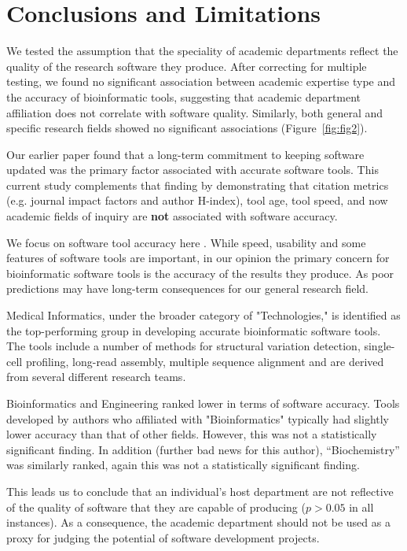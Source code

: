 \documentclass[fleqn,10pt,doc,onecolumn]{SelfArx}%
\begin{document}

\section*{Conclusions and Limitations}

We tested the assumption that the speciality of academic departments
reflect the quality of the research software they produce.  After
correcting for multiple testing, we found no significant association
between academic expertise type and the accuracy of bioinformatic
tools, suggesting that academic department affiliation does not
correlate with software quality. Similarly, both general and specific
research fields showed no significant associations
(Figure~\ref{fig:fig2}).

Our earlier paper found that a long-term commitment to keeping
software updated was the primary factor associated with accurate
software tools. This current study complements that finding by demonstrating 
that citation metrics (e.g. journal impact factors and
author H-index), tool age, tool speed, and now academic fields of
inquiry are \textbf{not} associated with software accuracy.

We focus on software tool accuracy here \cite{weber2019essential}. While speed, usability and
some features of software tools are important, in our opinion the
primary concern for bioinformatic software tools is the accuracy of
the results they produce. As poor predictions may have long-term consequences for
our general research field. 

Medical Informatics, under the broader category of "Technologies," is
identified as the top-performing group in developing accurate
bioinformatic software tools. The tools include a number of methods
for structural variation detection, single-cell profiling, long-read
assembly, multiple sequence alignment and are derived from several
different research teams. 

Bioinformatics and Engineering ranked lower in terms of software
accuracy. Tools developed by authors who affiliated with
"Bioinformatics" typically had slightly lower accuracy than that of
other fields. However, this was not a statistically significant
finding. In addition (further bad news for this author),
``Biochemistry'' was similarly ranked, again this was not a
statistically significant finding.

This leads us to conclude that an individual's host department are not
reflective of the quality of software that they are capable of
producing ($p>0.05$ in all instances). As a consequence, the academic
department should not be used as a proxy for judging the potential of
software development projects.
\end{document}
